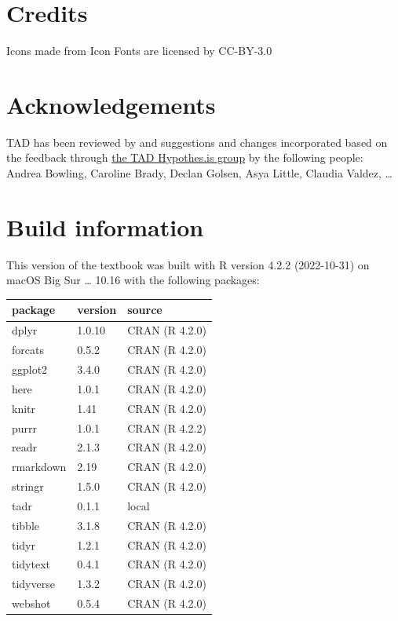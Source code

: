 \documentclass[
  letterpaper,
]{latex/krantz}
\begin{document}
\hypertarget{credits}{%
\section*{Credits}\label{credits}}


Icons made from Icon Fonts are licensed by CC-BY-3.0

\hypertarget{acknowledgements}{%
\section*{Acknowledgements}\label{acknowledgements}}


TAD has been reviewed by and suggestions and changes incorporated based
on the feedback through
\href{https://hypothes.is/groups/Q3o92MJg/tad}{the TAD Hypothes.is
group} by the following people: Andrea Bowling, Caroline Brady, Declan
Golsen, Asya Little, Claudia Valdez, \ldots{}

\hypertarget{build-information}{%
\section*{Build information}\label{build-information}}


This version of the textbook was built with R version 4.2.2 (2022-10-31)
on macOS Big Sur \ldots{} 10.16 with the following packages:

\begin{longtable}[]{@{}lll@{}}
\toprule()
package & version & source \\
\midrule()
\endhead
dplyr & 1.0.10 & CRAN (R 4.2.0) \\
forcats & 0.5.2 & CRAN (R 4.2.0) \\
ggplot2 & 3.4.0 & CRAN (R 4.2.0) \\
here & 1.0.1 & CRAN (R 4.2.0) \\
knitr & 1.41 & CRAN (R 4.2.0) \\
purrr & 1.0.1 & CRAN (R 4.2.2) \\
readr & 2.1.3 & CRAN (R 4.2.0) \\
rmarkdown & 2.19 & CRAN (R 4.2.0) \\
stringr & 1.5.0 & CRAN (R 4.2.0) \\
tadr & 0.1.1 & local \\
tibble & 3.1.8 & CRAN (R 4.2.0) \\
tidyr & 1.2.1 & CRAN (R 4.2.0) \\
tidytext & 0.4.1 & CRAN (R 4.2.0) \\
tidyverse & 1.3.2 & CRAN (R 4.2.0) \\
webshot & 0.5.4 & CRAN (R 4.2.0) \\
\bottomrule()
\end{longtable}
\end{document}
